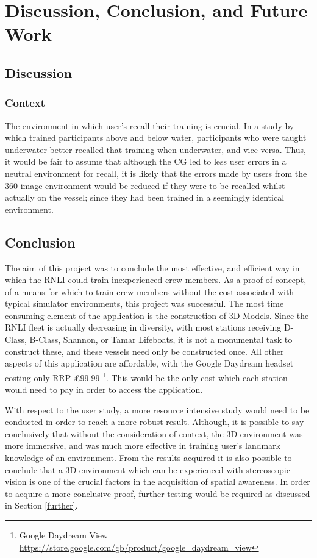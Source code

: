 \documentclass[a4paper, openright, twoside]{book}
\begin{document}
\chapter{Discussion, Conclusion, and Future Work}


\section{Discussion}

\subsection{Context}\label{context}
The environment in which user's recall their training is crucial. In a study by \cite{godden} which trained participants above and below water, participants who were taught underwater better recalled that training when underwater, and vice versa. Thus, it would be fair to assume that although the CG led to less user errors in a neutral environment for recall, it is likely that the errors made by users from the 360-image environment would be reduced if they were to be recalled whilst actually on the vessel; since they had been trained in a seemingly identical environment.

\section{Conclusion}
The aim of this project was to conclude the most effective, and efficient way in which the RNLI could train inexperienced crew members. As a proof of concept, of a means for which to train crew members without the cost associated with typical simulator environments, this project was successful. The most time consuming element of the application is the construction of 3D Models. Since the RNLI fleet is actually decreasing in diversity, with most stations receiving D-Class, B-Class, Shannon, or Tamar Lifeboats, it is not a monumental task to construct these, and these vessels need only be constructed once. All other aspects of this application are affordable, with the Google Daydream headset costing only RRP £99.99 \footnote{Google Daydream View \url{https://store.google.com/gb/product/google_daydream_view}}. This would be the only cost which each station would need to pay in order to access the application.

With respect to the user study, a more resource intensive study would need to be conducted in order to reach a more robust result. Although, it is possible to say conclusively that without the consideration of context, the 3D environment was more immersive, and was much more effective in training user's landmark knowledge of an environment. From the results acquired it is also possible to conclude that a 3D environment which can be experienced with stereoscopic vision is one of the crucial factors in the acquisition of spatial awareness. In order to acquire a more conclusive proof, further testing would be required as discussed in Section \ref{further}.   
\end{document}
